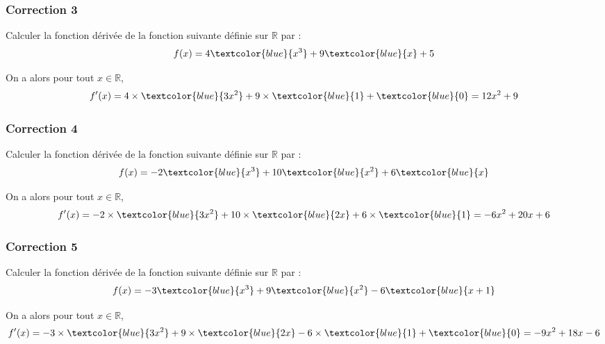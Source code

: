 \documentclass[15pt, mathserif]{beamer}
\newcommand{\R}{\mathbb{R}}			%
\begin{document}
\begin{frame}
\vspace{-10mm}
	\frametitle{Correction 3}
Calculer la fonction dérivée de la fonction suivante définie sur $\R$ par : $$f(x)=4\textcolor{blue}{x^3}+9\textcolor{blue}{x}+5$$
 
 On a alors pour tout $x \in  \R$, $$f'(x)= 4\times \textcolor{blue}{3x^2}+9\times \textcolor{blue}{1}+\textcolor{blue}{0}=12x^2+9$$\end{frame}


\begin{frame}
\vspace{-10mm}
	\frametitle{Correction 4}
Calculer la fonction dérivée de la fonction suivante définie sur $\R$ par : $$f(x)=-2\textcolor{blue}{x^3}+10\textcolor{blue}{x^2}+6\textcolor{blue}{x}$$
 
 On a alors pour tout $x \in  \R$, $$f'(x)=-2\times \textcolor{blue}{3x^2}  +10\times \textcolor{blue}{2x}+6\times \textcolor{blue}{1}=-6x^2 +20x+6$$\end{frame}


\begin{frame}
\vspace{-10mm}
	\frametitle{Correction 5}
Calculer la fonction dérivée de la fonction suivante définie sur $\R$ par : $$f(x)=-3\textcolor{blue}{x^3}+9\textcolor{blue}{x^2}-6\textcolor{blue}{x+1}$$
 
 On a alors pour tout $x \in  \R$, $$f'(x)= -3\times \textcolor{blue}{3x^2} +9\times \textcolor{blue}{2x}-6\times \textcolor{blue}{1}+\textcolor{blue}{0}=-9x^2+18x-6$$\end{frame}
\end{document}
